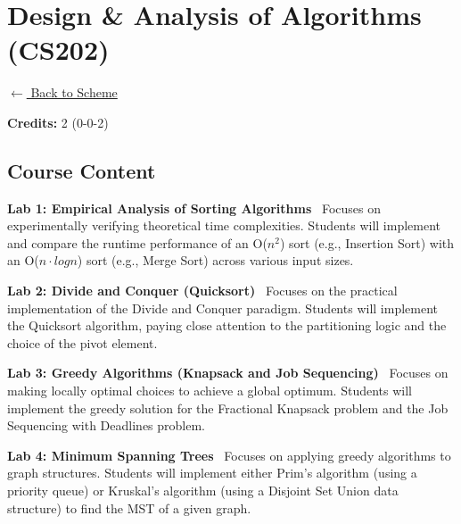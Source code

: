 \section*{Design \& Analysis of Algorithms (CS202)}
\label{course:CX202}

\noindent \small{\hyperref[main:scheme]{$\leftarrow$ Back to Scheme}} \vspace{0.5cm}

\noindent \textbf{Credits:} 2 (0-0-2)

\subsection*{Course Content}
\noindent\textbf{Lab 1: Empirical Analysis of Sorting Algorithms} \
Focuses on experimentally verifying theoretical time complexities. Students will implement and compare the runtime performance of an O($n^2$) sort (e.g., Insertion Sort) with an O($n \cdot log n$) sort (e.g., Merge Sort) across various input sizes. \\

\vspace{0.2cm}

\noindent\textbf{Lab 2: Divide and Conquer (Quicksort)} \
Focuses on the practical implementation of the Divide and Conquer paradigm. Students will implement the Quicksort algorithm, paying close attention to the partitioning logic and the choice of the pivot element. \\

\vspace{0.2cm}

\noindent\textbf{Lab 3: Greedy Algorithms (Knapsack and Job Sequencing)} \
Focuses on making locally optimal choices to achieve a global optimum. Students will implement the greedy solution for the Fractional Knapsack problem and the Job Sequencing with Deadlines problem. \\

\vspace{0.2cm}

\noindent\textbf{Lab 4: Minimum Spanning Trees} \
Focuses on applying greedy algorithms to graph structures. Students will implement either Prim's algorithm (using a priority queue) or Kruskal's algorithm (using a Disjoint Set Union data structure) to find the MST of a given graph. \\

\vspace{0.2cm}

